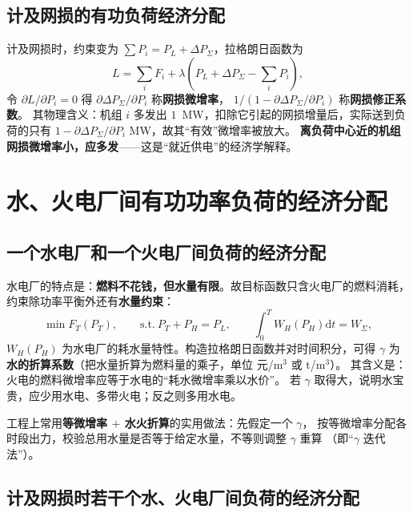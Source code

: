 \subsection{计及网损的有功负荷经济分配}

计及网损时，约束变为 $\sum P_i=P_L+\Delta P_{\Sigma}$，拉格朗日函数为
\begin{equation}
  L=\sum_{i}F_i+\lambda\left(P_L+\Delta P_{\Sigma}-\sum_{i}P_i\right),
\end{equation}
令 $\partial L/\partial P_i=0$ 得
$\partial\Delta P_{\Sigma}/\partial P_i$ 称\textbf{网损微增率}，
$1/(1-\partial\Delta P_{\Sigma}/\partial P_i)$ 称\textbf{网损修正系数}。
其物理含义：机组 $i$ 多发出 $1$~MW，扣除它引起的网损增量后，实际送到负荷的只有
$1-\partial\Delta P_{\Sigma}/\partial P_i$ MW，故其“有效”微增率被放大。
\textbf{离负荷中心近的机组网损微增率小，应多发}——这是“就近供电”的经济学解释。

\section{水、火电厂间有功功率负荷的经济分配}

\subsection{一个水电厂和一个火电厂间负荷的经济分配}

水电厂的特点是：\textbf{燃料不花钱，但水量有限}。故目标函数只含火电厂的燃料消耗，
约束除功率平衡外还有\textbf{水量约束}：
\begin{equation}
  \min F_T\left(P_T\right),\qquad
  \text{s.t.}\ P_T+P_H=P_L,\qquad \int_{0}^{T}W_H\left(P_H\right)\mathrm{d}t=W_{\Sigma},
\end{equation}
$W_H(P_H)$ 为水电厂的耗水量特性。构造拉格朗日函数并对时间积分，可得
$\gamma$ 为\textbf{水的折算系数}（把水量折算为燃料量的乘子，单位 元/m$^3$ 或 t/m$^3$）。
其含义是：火电的燃料微增率应等于水电的“耗水微增率乘以水价”。
若 $\gamma$ 取得大，说明水宝贵，应少用水电、多带火电；反之则多用水电。

工程上常用\textbf{等微增率 $+$ 水火折算}的实用做法：先假定一个 $\gamma$，
按等微增率分配各时段出力，校验总用水量是否等于给定水量，不等则调整 $\gamma$ 重算
（即“$\gamma$ 迭代法”）。

\subsection{计及网损时若干个水、火电厂间负荷的经济分配}


